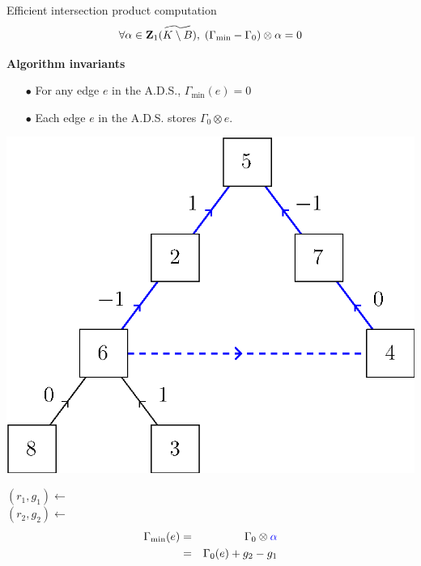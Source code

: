 \begin{frame}{Efficient intersection product computation}
	\small
	\[
		\forall \alpha \in \mathbf{Z}_1(\widetilde{K \setminus B}), \; (\Gamma_{\min} - \Gamma_0) \otimes \alpha = 0
	\]
	
	\pause
	\textbf{Algorithm invariants}
	\begin{itemize}
		\item[$\bullet$] For any edge $e$ in the A.D.S., $\Gamma_{\min}(e) = 0$
		\item[$\bullet$] Each edge $e$ in the A.D.S. stores $\Gamma_0 \otimes e$.
	\end{itemize}
		
	\pause
	\begin{minipage}{0.45\linewidth}
		\centering
		\includegraphics[width=\linewidth]{ds/augmented_disjoint_cycle}
	\end{minipage}%
	\hfill
	\begin{minipage}{0.45\linewidth}
	\pause $(r_1, g_1) \leftarrow$ \\
	\pause $(r_2, g_2) \leftarrow$ \\
	\pause \begin{eqnarray*} 
				\Gamma_{\min}(e) &=& \Gamma_0 \otimes {\color{blue}\alpha}  \\
								 &=& \Gamma_0(e) + g_2 - g_1
			\end{eqnarray*}
	\end{minipage}
\end{frame}
%

